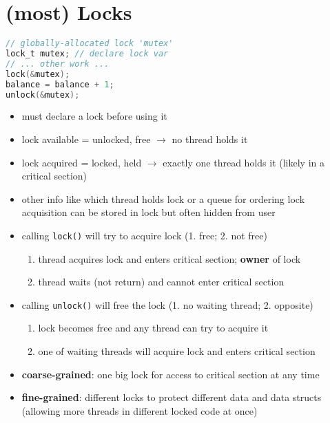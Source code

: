 \section*{(most) Locks}
\begin{minipage}{.5\linewidth}
\begin{lstlisting}[language=c,xrightmargin=2pt]
// globally-allocated lock 'mutex'
lock_t mutex; // declare lock var
// ... other work ...
lock(&mutex);
balance = balance + 1;
unlock(&mutex);
\end{lstlisting}
\end{minipage}
\begin{minipage}{.5\linewidth}
  \begin{itemize}
  \item must declare a lock before using it
  \item lock available = unlocked, free $\to$ no thread holds it
  \item lock acquired = locked, held $\to$ exactly one thread holds it (likely in a critical section)
  \end{itemize}
\end{minipage}
\begin{itemize}
\item other info like which thread holds lock or a queue for ordering lock acquisition can be stored in lock but often hidden from user
\item calling \texttt{lock()} will try to acquire lock (1. free; 2. not free)
  \begin{enumerate}
  \item thread acquires lock and enters critical section; \textbf{owner} of lock
  \item thread waits (not return) and cannot enter critical section
  \end{enumerate}
\item calling \texttt{unlock()} will free the lock (1. no waiting thread; 2. opposite)
  \begin{enumerate}
  \item lock becomes free and any thread can try to acquire it
  \item one of waiting threads will acquire lock and enters critical section
  \end{enumerate}

\item \textbf{coarse-grained}: one big lock for access to critical section at any time
\item \textbf{fine-grained}: different locks to protect different data and data structs (allowing more threads in different locked code at once)
\end{itemize}
